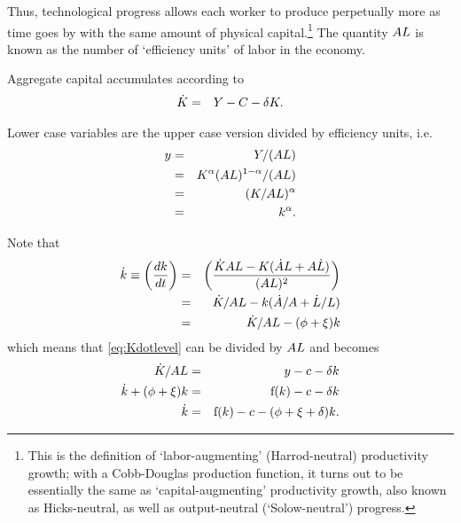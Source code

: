 \documentclass{handout}
\begin{document}
Thus, technological progress allows each worker to
produce perpetually more  as time goes by with the same amount of 
physical capital.\footnote{This is the definition of `labor-augmenting' (Harrod-neutral) 
productivity growth; with a Cobb-Douglas production function, it turns out to be essentially the same as `capital-augmenting' productivity growth, also known as Hicks-neutral, as well as output-neutral (`Solow-neutral') progress.}  The quantity $A L$ is known as the number of `efficiency 
units' of labor in the economy.

Aggregate capital accumulates according to
\begin{eqnarray}
        \dot{{K}} & = & {Y} - C - \delta K \label{eq:Kdotlevel}.
\end{eqnarray}

Lower case variables are the upper case version divided by efficiency units, i.e.
\begin{eqnarray}
        {y} & = & {Y}/(A L)  \\
         & = & {K}^{\alpha}(A L)^{1-\alpha}/(A L)  \\
         & = & ({K}/A L)^{\alpha}
\\   & = & {k}^{\alpha}    .
\end{eqnarray}

Note that 
\begin{eqnarray}
 \dot{{k}} \equiv       \left(\frac{d{k}}{dt}\right) & = & \left(\frac{\dot{{K}}A L - K(\dot{A }L + A \dot{L})}{(A L)^{2}}\right) 
\\   & = & \dot{{K}}/A L - k(\dot{A }/{A } + \dot{L}/L)
\\          & = & \dot{{K}}/A L - (\phi +\xi)k
\end{eqnarray}
which means that \eqref{eq:Kdotlevel} can be divided by $A L$ and becomes
\begin{eqnarray}
        \dot{{K}}/A L & = & {y} - c - \delta {k}  \\
        \dot{{k}}+(\phi +\xi)k & = & \mathrm{f}({k}) - c - \delta {k}  \\
        \dot{{k}} & = & \mathrm{f}({k}) - c - (\phi +\xi+\delta) {k} \label{eq:kdot}.
\end{eqnarray}
\end{document}

